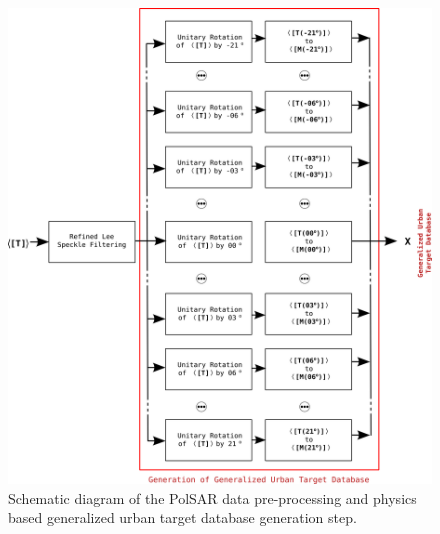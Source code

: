 \begin{figure}[tp]
\centering
\includegraphics[width = 0.90\columnwidth]{Figures/Trento/Method1}
\caption[PolSAR data preprocessing]{Schematic diagram of the PolSAR data pre-processing and physics based generalized urban target database generation step.}
\label{fig:method1}
\end{figure}




